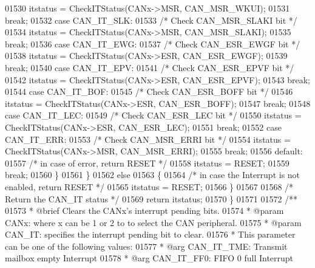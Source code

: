 \begin{DoxyCode}
01530         itstatus = CheckITStatus(CANx->MSR, CAN_MSR_WKUI);
01531         \textcolor{keywordflow}{break};
01532       \textcolor{keywordflow}{case} CAN_IT_SLK:
01533         \textcolor{comment}{/* Check CAN\_MSR\_SLAKI bit */}
01534         itstatus = CheckITStatus(CANx->MSR, CAN_MSR_SLAKI);
01535         \textcolor{keywordflow}{break};
01536       \textcolor{keywordflow}{case} CAN_IT_EWG:
01537         \textcolor{comment}{/* Check CAN\_ESR\_EWGF bit */}
01538         itstatus = CheckITStatus(CANx->ESR, CAN_ESR_EWGF);
01539         \textcolor{keywordflow}{break};
01540       \textcolor{keywordflow}{case} CAN_IT_EPV:
01541         \textcolor{comment}{/* Check CAN\_ESR\_EPVF bit */}
01542         itstatus = CheckITStatus(CANx->ESR, CAN_ESR_EPVF);
01543         \textcolor{keywordflow}{break};
01544       \textcolor{keywordflow}{case} CAN_IT_BOF:
01545         \textcolor{comment}{/* Check CAN\_ESR\_BOFF bit */}
01546         itstatus = CheckITStatus(CANx->ESR, CAN_ESR_BOFF);
01547         \textcolor{keywordflow}{break};
01548       \textcolor{keywordflow}{case} CAN_IT_LEC:
01549         \textcolor{comment}{/* Check CAN\_ESR\_LEC bit */}
01550         itstatus = CheckITStatus(CANx->ESR, CAN_ESR_LEC);
01551         \textcolor{keywordflow}{break};
01552       \textcolor{keywordflow}{case} CAN_IT_ERR:
01553         \textcolor{comment}{/* Check CAN\_MSR\_ERRI bit */}
01554         itstatus = CheckITStatus(CANx->MSR, CAN_MSR_ERRI);
01555         \textcolor{keywordflow}{break};
01556       \textcolor{keywordflow}{default}:
01557         \textcolor{comment}{/* in case of error, return RESET */}
01558         itstatus = RESET;
01559         \textcolor{keywordflow}{break};
01560     \}
01561   \}
01562   \textcolor{keywordflow}{else}
01563   \{
01564    \textcolor{comment}{/* in case the Interrupt is not enabled, return RESET */}
01565     itstatus  = RESET;
01566   \}
01567 
01568   \textcolor{comment}{/* Return the CAN\_IT status */}
01569   \textcolor{keywordflow}{return}  itstatus;
01570 \}
01571 
01572 \textcolor{comment}{/**}
01573 \textcolor{comment}{  * @brief  Clears the CANx's interrupt pending bits.}
01574 \textcolor{comment}{  * @param  CANx: where x can be 1 or 2 to to select the CAN peripheral.}
01575 \textcolor{comment}{  * @param  CAN\_IT: specifies the interrupt pending bit to clear.}
01576 \textcolor{comment}{  *          This parameter can be one of the following values:}
01577 \textcolor{comment}{  *            @arg CAN\_IT\_TME: Transmit mailbox empty Interrupt}
01578 \textcolor{comment}{  *            @arg CAN\_IT\_FF0: FIFO 0 full Interrupt}

\end{DoxyCode}
